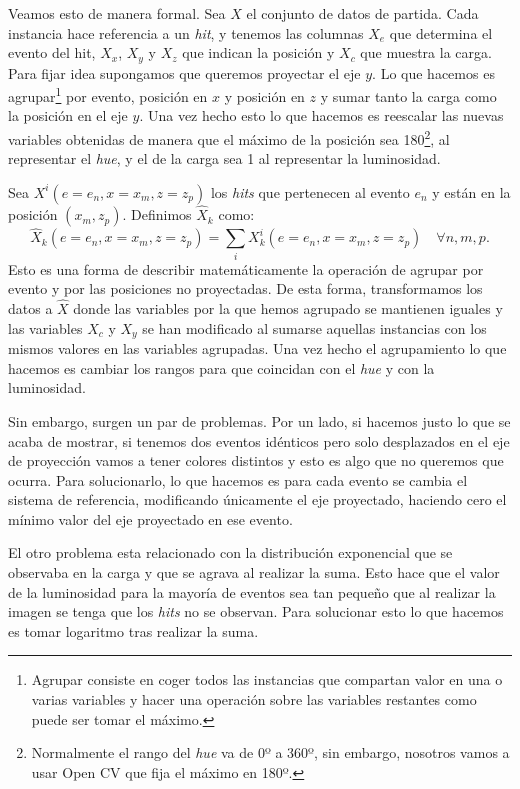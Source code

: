 \documentclass[a4paper,12pt,twoside,titlepage]{article}
\begin{document}
Veamos esto de manera formal. Sea $X$ el conjunto de datos de partida. Cada instancia hace referencia a un \textit{hit}, y tenemos las columnas $X_e$ que determina el evento del hit, $X_x$, $X_y$ y $X_z$ que indican la posición y $X_c$ que muestra la carga. Para fijar idea supongamos que queremos proyectar el eje $y$. Lo que hacemos es agrupar\footnote{Agrupar consiste en coger todos las instancias que compartan valor en una o varias variables y hacer una operación sobre las variables restantes como puede ser tomar el máximo.} por evento, posición en $x$ y posición en $z$ y sumar tanto la carga como la posición en el eje $y$. Una vez hecho esto lo que hacemos es reescalar las nuevas variables obtenidas de manera que el máximo de la posición sea 180\footnote{Normalmente el rango del \textit{hue} va de 0º a 360º, sin embargo, nosotros vamos a usar Open CV que fija el máximo en 180º.}, al representar el \textit{hue}, y el de la carga sea 1 al representar la luminosidad.

Sea $X^i\left(e = e_n, x=x_m, z=z_p\right)$ los \textit{hits} que pertenecen al evento $e_n$ y están en la posición $(x_m, z_p)$. Definimos $\hat{X}_k$ como:
\begin{equation}
  \hat{X}_k\left(e = e_n, x=x_m, z=z_p\right) = \sum_i X^i_k\left(e = e_n, x=x_m, z=z_p\right) \quad \forall n, m, p.
\end{equation}
Esto es una forma de describir matemáticamente la operación de agrupar por evento y por las posiciones no proyectadas. De esta forma, transformamos los datos a $\hat{X}$ donde las variables por la que hemos agrupado se mantienen iguales y las variables $X_c$ y $X_y$ se han modificado al sumarse aquellas instancias con los mismos valores en las variables agrupadas. Una vez hecho el agrupamiento lo que hacemos es cambiar los rangos para que coincidan con el \textit{hue} y con la luminosidad.

Sin embargo, surgen un par de problemas. Por un lado, si hacemos justo lo que se acaba de mostrar, si tenemos dos eventos idénticos pero solo desplazados en el eje de proyección vamos a tener colores distintos y esto es algo que no queremos que ocurra. Para solucionarlo, lo que hacemos es para cada evento se cambia el sistema de referencia, modificando únicamente el eje proyectado, haciendo cero el mínimo valor del eje proyectado en ese evento. 

El otro problema esta relacionado con la distribución exponencial que se observaba en la carga y que se agrava al realizar la suma. Esto hace que el valor de la luminosidad para la mayoría de eventos sea tan pequeño que al realizar la imagen se tenga que los \textit{hits} no se observan. Para solucionar esto lo que hacemos es tomar logaritmo tras realizar la suma.
\end{document}
